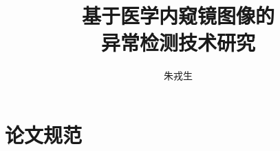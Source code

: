 \documentclass[master,print]{ustcthesis}
\title{基于医学内窥镜图像的\\异常检测技术研究}
\author{朱戎生}
\begin{document}
\maketitle

%
%
%

\frontmatter

\tableofcontents
\listoffigures
\listoftables
\listofalgorithms  %
% 

\mainmatter










\appendix
\chapter{论文规范}

\backmatter


\end{document}
